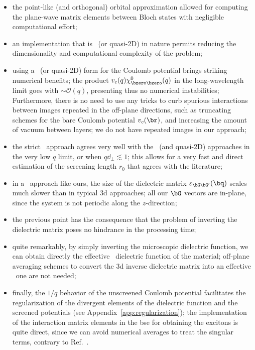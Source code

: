 \begin{itemize}
    \item the point-like (and orthogonal) orbital approximation allowed for computing the plane-wave matrix elements between Bloch states with negligible computational effort;
    \vspace{-0.2cm}
    \item an implementation that is \bd~(or quasi-2D) in nature permits reducing the dimensionality and computational complexity of the problem;
    \vspace{-0.2cm}
    \item using a \bd~(or quasi-2D) form for the Coulomb potential brings striking numerical benefits; the product $v_c(q) \chi^0_{\bzero \bzero}(q)$ in the long-wavelength limit goes with $\sim \mathcal{O}(q)$, presenting thus no numerical instabilities;
    Furthermore, there is no need to use any tricks to curb spurious interactions between images repeated in the off-plane directions, such as truncating schemes for the bare Coulomb potential $v_c(\br)$, and increasing the amount of vacuum between layers; we do not have repeated images in our approach;
    \vspace{-0.2cm}
    \item the strict \bd~approach agrees very well with the \abinit~(and quasi-2D) approaches in the very low $q$ limit, or when $q \dd_{\perp} \lesssim 1$; this allows for a very fast and direct estimation of the screening length $r_0$ that agrees with the literature;
    \vspace{-0.2cm}
    \item in a \bd~approach like ours, the size of the dielectric matrix $\varepsilon_{\bG \bG'} (\bq)$ scales much slower than in typical \gls{3d} approaches; all our $\bG$ vectors are in-plane, since the system is not periodic along the $z$-direction;
    \vspace{-0.2cm}
    \item the previous point has the consequence that the problem of inverting the dielectric matrix poses no hindrance in the processing time;
    \vspace{-0.2cm}
    \item quite remarkably, by simply inverting the microscopic dielectric function, we can obtain directly the effective \bd~dielectric function of the material; off-plane averaging schemes to convert the \gls{3d} inverse dielectric matrix into an effective \bd~one are not needed;
    \vspace{-0.2cm}
    \item finally, the $1/q$ behavior of the unscreened Coulomb potential facilitates the regularization of the divergent elements of the dielectric function and the screened potentials (see Appendix~\ref{app:regularization}); the implementation of the interaction matrix elements in the \gls{bse} for obtaining the excitons is quite direct, since we can avoid numerical averages to treat the singular terms, contrary to Ref.~\cite{Rasmussen_Schmidt_Winther_Thygesen_2016}.
\end{itemize}

